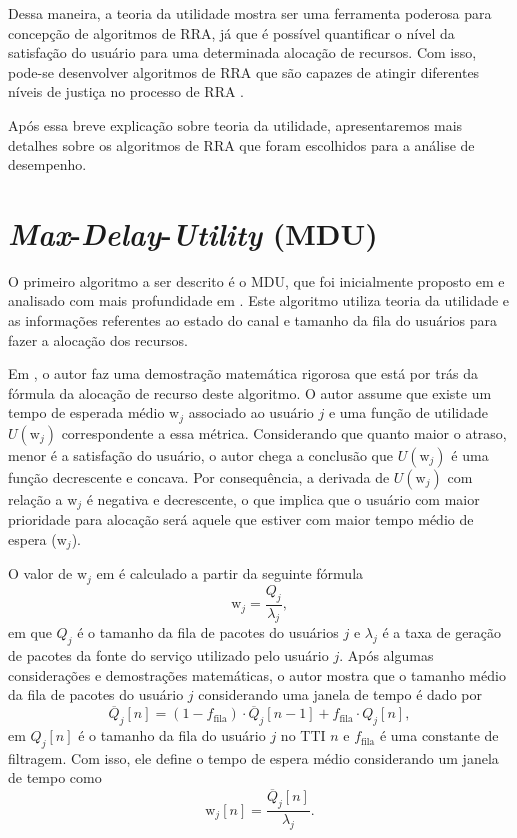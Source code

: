 Dessa maneira, a teoria da utilidade mostra ser uma ferramenta poderosa para concepção de algoritmos de RRA, já que é possível quantificar o nível da satisfação do usuário para uma determinada alocação de recursos. Com isso, pode-se desenvolver algoritmos de RRA que são capazes de atingir diferentes níveis de justiça no processo de RRA \cite{rodrigues2011adaptive,Phd:Song2005}.

Após essa breve explicação sobre teoria da utilidade, apresentaremos mais detalhes sobre os algoritmos de RRA que foram escolhidos para a análise de desempenho.

\section{\textit{Max}-\textit{Delay}-\textit{Utility} (MDU)}

O primeiro algoritmo a ser descrito é o MDU, que foi inicialmente proposto em  e analisado com mais profundidade em . Este algoritmo utiliza teoria da utilidade e as informações referentes ao estado do canal e tamanho da fila do usuários para fazer a alocação dos recursos. 

Em , o autor faz uma demostração matemática rigorosa que está por trás da fórmula da alocação de recurso deste algoritmo. O autor assume que existe um tempo de esperada médio $\text{w}_j$ associado ao usuário $j$ e uma função de utilidade $U(\text{w}_j)$ correspondente a essa métrica. Considerando que quanto maior o atraso, menor é a satisfação do usuário, o autor chega a conclusão que $U(\text{w}_j)$ é uma função decrescente e concava. Por consequência, a derivada de $U(\text{w}_j)$ com relação a $\text{w}_j$ é negativa e decrescente, o que implica que o usuário com maior prioridade para alocação será aquele que estiver com maior tempo médio de espera ($\text{w}_j$).

O valor de $\text{w}_j$ em  é calculado a partir da seguinte fórmula
%
\begin{equation}
	\text{w}_j = \frac{Q_j}{\lambda_j},
\end{equation}
%
em que $Q_j$ é o tamanho da fila de pacotes do usuários $j$ e $\lambda_j$ é a taxa de geração de pacotes da fonte do serviço utilizado pelo usuário $j$. Após algumas considerações e demostrações matemáticas, o autor mostra que o tamanho médio da fila de pacotes do usuário $j$ considerando uma janela de tempo é dado por
%
\begin{equation}
\label{JSM:Eq:Util_Avg_Queue_Calc}
\overline{Q}_{j}\left[n\right] = \left(1 - f_{\mathrm{fila}}\right) \cdot \overline{Q}_{j}\left[n-1\right] + f_{\mathrm{fila}} \cdot Q_{j}\left[n\right],
\end{equation} %
%
em $Q_{j}\left[n\right]$ é o tamanho da fila do usuário $j$ no TTI $n$ e $f_{\mathrm{fila}}$ é uma constante de filtragem. Com isso, ele define o tempo de espera médio considerando um janela de tempo como 
%
\begin{equation}
\label{Eq:AvgWait}
\text{w}_j[n] = \frac{\overline{Q}_{j}\left[n\right]}{\lambda_j}.
\end{equation}

